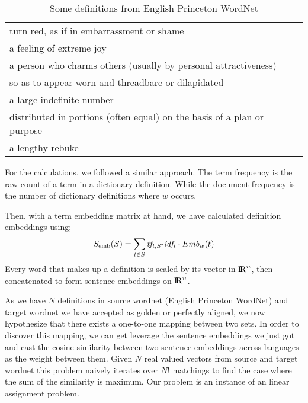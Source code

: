 \begin{table}
    \centering
    \begin{tabular}{l}
        \toprule
        turn red, as if in embarrassment or shame \\
        a feeling of extreme joy \\
        a person who charms others (usually by personal attractiveness) \\
        so as to appear worn and threadbare or dilapidated \\
        a large indefinite number \\
        distributed in portions (often equal) on the basis of a plan or purpose \\
        a lengthy rebuke \\
        \bottomrule
    \end{tabular}
    \caption{Some definitions from English Princeton WordNet}%
    \label{tab:en_it_examples}
\end{table}

For the \tfidf{} calculations, we followed a similar approach.
The term frequency is the raw count of a term in a dictionary definition.
While the document frequency is the number of dictionary definitions where $w$ occurs.

Then, with a term embedding matrix at hand, we have calculated definition embeddings using;
\begin{equation}
    S_{\text{emb}}(S) = \sum_{t \in S} {\operatorname{\mathit{tf_{t,S}-idf_{t}}}} \cdot Emb_{w}(t)
\end{equation}
Every word that makes up a definition is scaled by its vector in ${\rm I\!R}^n$, then concatenated to form sentence embeddings on ${\rm I\!R}^n$.

As we have $N$ definitions in source wordnet (English Princeton WordNet) and target wordnet we have accepted as golden or perfectly aligned, we now hypothesize that there exists a one-to-one mapping between two sets.
In order to discover this mapping, we can get leverage the sentence embeddings we just got and cast the cosine similarity between two sentence embeddings across languages as the weight between them.
Given $N$ real valued vectors from source and target wordnet this problem naively iterates over $N!$ matchings to find the case where the sum of the similarity is maximum.
Our problem is an instance of an linear assignment problem.

